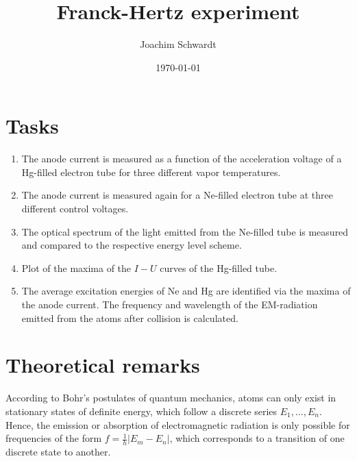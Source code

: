 \documentclass[a4paper,12pt]{article}
\begin{document}
\title{Franck-Hertz experiment}
\author{Joachim Schwardt}
\date{\today}
\maketitle

\section{Tasks}
\begin{enumerate}
\item The anode current is measured as a function of the acceleration voltage of a Hg-filled electron tube for three different vapor temperatures. 
\item The anode current is measured again for a Ne-filled electron tube at three different control voltages. 
\item The optical spectrum of the light emitted from the Ne-filled tube is measured and compared to the respective energy level scheme.
\item Plot of the maxima of the $I-U$ curves of the Hg-filled tube. 
\item The average excitation energies of Ne and Hg are identified via the maxima of the anode current. The frequency and wavelength of the EM-radiation emitted from the atoms after collision is calculated. 
\end{enumerate}
\section{Theoretical remarks}
According to Bohr's postulates of quantum mechanics, atoms can only exist in stationary states of definite energy, which follow a discrete series $E_1,\dots,E_n$. Hence, the emission or absorption of electromagnetic radiation is only possible for frequencies of the form $f=\frac{1}{h}|E_m-E_n|$, which corresponds to a transition of one discrete state to another. 
\end{document}
